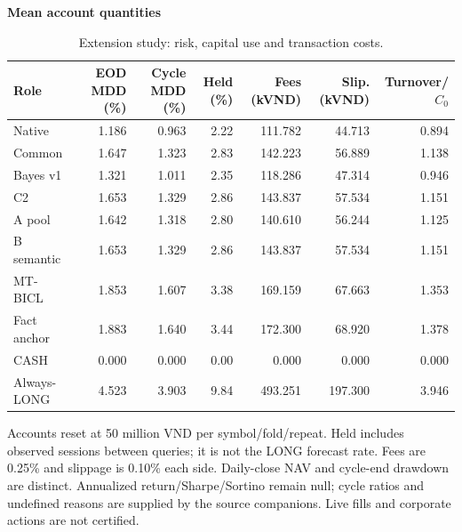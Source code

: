 \begin{table}[p]
\centering\small
\setlength{\tabcolsep}{3pt}
\renewcommand{\arraystretch}{1.12}
\caption{Extension study: risk, capital use and transaction costs.}
\label{tab:u09-economics}
\textbf{Mean account quantities}\par\smallskip
\begin{tabular}{lrrrrrr}
\hline
Role & EOD MDD (\%) & Cycle MDD (\%) & Held (\%) & Fees (kVND) & Slip. (kVND) & Turnover/$C_0$ \\
\hline
Native & 1.186 & 0.963 & 2.22 & 111.782 & 44.713 & 0.894 \\
Common & 1.647 & 1.323 & 2.83 & 142.223 & 56.889 & 1.138 \\
Bayes v1 & 1.321 & 1.011 & 2.35 & 118.286 & 47.314 & 0.946 \\
C2 & 1.653 & 1.329 & 2.86 & 143.837 & 57.534 & 1.151 \\
A pool & 1.642 & 1.318 & 2.80 & 140.610 & 56.244 & 1.125 \\
B semantic & 1.653 & 1.329 & 2.86 & 143.837 & 57.534 & 1.151 \\
MT-BICL & 1.853 & 1.607 & 3.38 & 169.159 & 67.663 & 1.353 \\
Fact anchor & 1.883 & 1.640 & 3.44 & 172.300 & 68.920 & 1.378 \\
CASH & 0.000 & 0.000 & 0.00 & 0.000 & 0.000 & 0.000 \\
Always-LONG & 4.523 & 3.903 & 9.84 & 493.251 & 197.300 & 3.946 \\
\hline
\end{tabular}\par\medskip
\begin{minipage}{\textwidth}\footnotesize Accounts reset at 50 million VND per symbol/fold/repeat. Held includes observed sessions between queries; it is not the LONG forecast rate. Fees are 0.25\% and slippage is 0.10\% each side. Daily-close NAV and cycle-end drawdown are distinct. Annualized return/Sharpe/Sortino remain null; cycle ratios and undefined reasons are supplied by the source companions. Live fills and corporate actions are not certified.\end{minipage}
\end{table}
